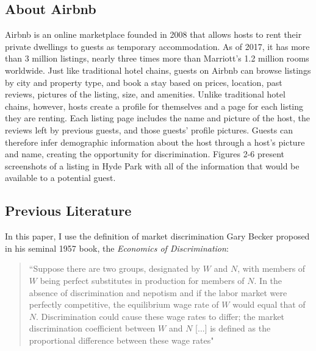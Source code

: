 \documentclass[11pt, oneside]{article}
\begin{document}



\subsection{About Airbnb} %
Airbnb is an online marketplace founded in 2008 that allows hosts to rent their private dwellings to guests as temporary accommodation. As of 2017, it has more than 3 million listings, nearly three times more than Marriott's 1.2 million rooms worldwide.\cite{aboutus} Just like traditional hotel chains, guests on Airbnb can browse listings by city and property type, and book a stay based on prices, location, past reviews, pictures of the listing, size, and amenities. Unlike traditional hotel chains, however, hosts create a profile for themselves and a page for each listing they are renting. Each listing page includes the name and picture of the host, the reviews left by previous guests, and those guests' profile pictures. Guests can therefore infer demographic information about the host through a host's picture and name, creating the opportunity for discrimination. Figures 2-6 present screenshots of a listing in Hyde Park with all of the information that would be available to a potential guest. 


\subsection{Previous Literature} %
In this paper, I use the definition of market discrimination Gary Becker proposed in his seminal 1957 book, the \textit{Economics of Discrimination}: \cite{becker}

\begin{quotation}
``Suppose there are two groups, designated by $W$ and $N$, with members of $W$ being perfect substitutes in production for members of $N$. In the absence of discrimination and nepotism and if the labor market were perfectly competitive, the equilibrium wage rate of $W$ would equal that of $N$. Discrimination could cause these wage rates to differ; the market discrimination coefficient between $W$ and $N$ [...] is defined as the proportional difference between these wage rates" \end{quotation}
 
\end{document}
